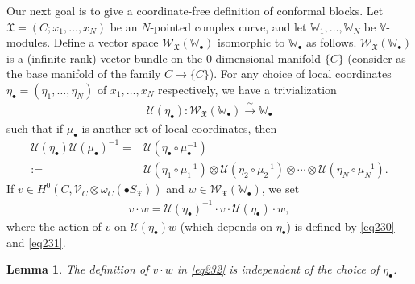 \documentclass[12pt,b5paper,notitlepage]{report}
\theoremstyle{definition}
\theoremstyle{plain}
\newtheorem{lm}[df]{Lemma}
\newcommand{\fk}{\mathfrak}
\newcommand{\mc}{\mathcal}
\newcommand{\scr}{\mathscr}
\newcommand{\blt}{\bullet}
\newcommand{\Vbb}{\mathbb V}
\newcommand{\Wbb}{\mathbb W}
\numberwithin{equation}{section}
\begin{document}
Our next goal is to give a coordinate-free definition of conformal blocks. Let $\fk X=(C;x_1,\dots,x_N)$ be an $N$-pointed complex curve, and let $\Wbb_1,\dots,\Wbb_N$ be $\Vbb$-modules. Define a vector space $\scr W_{\fk X}(\Wbb_\blt)$ isomorphic to $\Wbb_\blt$ as follows. $\scr W_{\fk X}(\Wbb_\blt)$ is a (infinite rank) vector bundle on the $0$-dimensional manifold $\{C\}$ (consider as the base manifold of the family $C\rightarrow \{C\}$). For any choice of local coordinates $\eta_\blt=(\eta_1,\dots,\eta_N)$ of $x_1,\dots,x_N$ respectively, we have a trivialization \index{U@$\mc U(\rho),\mc U(\eta_\blt)$}
\begin{align}
\mc U(\eta_\blt):\scr W_{\fk X}(\Wbb_\blt)\xrightarrow{\simeq} \Wbb_\blt  \label{eq121}
\end{align}
such that if $\mu_\blt$ is another set of local coordinates, then
\begin{align}
\mc U(\eta_\blt)\mc U(\mu_\blt)^{-1}=&\mc U(\eta_\blt\circ\mu_\blt^{-1})\nonumber\\
:=&\mc U(\eta_1\circ\mu_1^{-1})\otimes \mc U(\eta_2\circ\mu_2^{-1})\otimes\cdots\otimes \mc U(\eta_N\circ\mu_N^{-1}).\label{eq123}
\end{align}
If $v\in H^0(C,\scr V_C\otimes\omega_C(\blt S_{\fk X}))$ and $w\in\scr W_{\fk X}(\Wbb_\blt)$, we set
\begin{align}
v\cdot w=\mc U(\eta_\blt)^{-1}\cdot v\cdot\mc U(\eta_\blt)\cdot w,\label{eq232}
\end{align}
where the action of $v$ on $\mc U(\eta_\blt)w$ (which depends on $\eta_\blt$) is defined by \eqref{eq230} and \eqref{eq231}.


\begin{lm}\label{lb125}
The definition of $v\cdot w$ in \eqref{eq232} is independent of the choice of $\eta_\blt$.
\end{lm}
 
\end{document}
